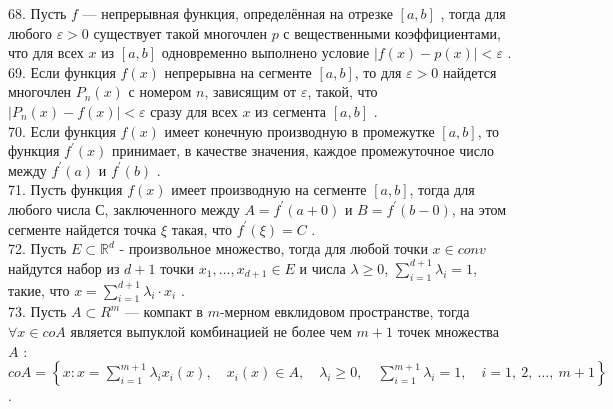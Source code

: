\documentclass[12pt]{article}
\begin{document}
68. Пусть ${\displaystyle f}$ — непрерывная функция, определённая на отрезке ${\displaystyle [a,b]}$ , тогда для любого ${\displaystyle \varepsilon >0}$ существует такой многочлен ${\displaystyle p}$  с вещественными коэффициентами, что для всех ${\displaystyle x}$  из ${\displaystyle [a,b]}$ одновременно выполнено условие ${\displaystyle |f(x)-p(x)|<\varepsilon }$ .\\

69. Если функция ${\displaystyle f(x)}$ непрерывна на сегменте ${\displaystyle [a,b]}$, то для ${\displaystyle \varepsilon>0}$ найдется многочлен ${\displaystyle P_n(x)}$ с номером ${\displaystyle n}$, зависящим от ${\displaystyle \varepsilon}$, такой, что ${\displaystyle |P_n(x)-f(x)|<\varepsilon}$ сразу для всех ${\displaystyle x}$ из сегмента ${\displaystyle [a,b]}$ .\\

70. Если функция ${\displaystyle f(x)}$ имеет конечную производную в промежутке ${\displaystyle [a,b]}$, то функция ${\displaystyle f^{\prime}(x)}$ принимает, в качестве значения, каждое промежуточное число между ${\displaystyle f^{\prime}(a)}$ и ${\displaystyle f^{\prime}(b)}$ .\\

71. Пусть функция ${\displaystyle f(x)}$ имеет производную на сегменте ${\displaystyle [a,b]}$, тогда для любого числа ${\displaystyle С}$, заключенного между ${\displaystyle A=f^{\prime}(a+0)}$ и ${\displaystyle B=f^{\prime}(b-0)}$, на этом сегменте найдется точка ${\displaystyle \xi}$ такая, что ${\displaystyle f^{\prime}(\xi)=C}$ .\\

72. Пусть ${\displaystyle E \subset \mathbb{R}^d}$ - произвольное множество, тогда для любой точки ${\displaystyle x \in conv}$ найдутся набор из ${\displaystyle d+1}$ точки ${\displaystyle x_1,\ldots,x_{d+1} \in E}$ и числа ${\displaystyle \lambda \geq 0}$, ${\sum \limits _{i=1}^{d+1} \lambda_i=1}$, такие, что ${\displaystyle  x=\sum \limits _{i=1}^{d+1} \lambda_i\cdot x_i}$ .\\

73. Пусть ${\displaystyle A\subset R^{m}}$  — компакт в ${\displaystyle m}$-мерном евклидовом пространстве, тогда ${\displaystyle \forall x\in coA}$ является выпуклой комбинацией не более чем ${\displaystyle m + 1}$ точек множества ${\displaystyle A}$ : ${\displaystyle coA=\left\{x:x=\sum _{i=1}^{m+1}\lambda _{i}x_{i}(x),\quad x_{i}(x)\in A,\quad \lambda _{i}\geqslant 0,\quad \sum _{i=1}^{m+1}\lambda _{i}=1,\quad i=1,\ 2,\ \dots ,\ m+1\right\}}$ .\\
\end{document}
